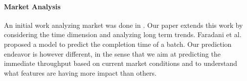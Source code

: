 \paragraph{Market Analysis}
An initial work analyzing \amt{} market was done in \cite{mturk}. Our paper extends this work by considering the time dimension and analyzing long term trends.
Faradani et al. \cite{faradani2011s} proposed a model to predict the completion time of a batch. Our prediction endeavor is however different, in the sense that we aim at predicting the immediate throughput based on current market conditions and to understand what features are having more impact than others.

%
%


